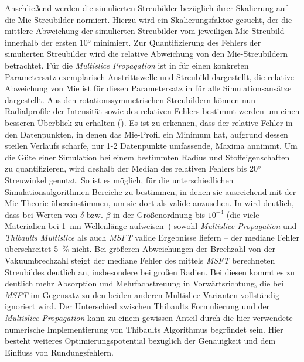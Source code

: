 Anschließend werden die simulierten Streubilder bezüglich ihrer Skalierung auf die Mie-Streubilder normiert. Hierzu wird ein Skalierungsfaktor gesucht, der die mittlere Abweichung der simulierten Streubilder vom jeweiligen Mie-Streubild innerhalb der ersten 10° minimiert. Zur Quantifizierung des Fehlers der simulierten Streubilder wird die relative Abweichung von den Mie-Streubildern betrachtet. Für die \textit{Multislice Propagation} ist in  für einen konkreten Parametersatz exemplarisch Austrittswelle und Streubild dargestellt, die relative Abweichung von Mie ist für diesen Parametersatz in  für alle Simulationsansätze dargestellt. Aus den rotationssymmetrischen Streubildern können nun Radialprofile der Intensität sowie des relativen Fehlers bestimmt werden um einen besseren Überblick zu erhalten (). Es ist zu erkennen, dass der relative Fehler in den Datenpunkten, in denen das Mie-Profil ein Minimum hat, aufgrund dessen steilen Verlaufs scharfe, nur 1-2 Datenpunkte umfassende, Maxima annimmt. Um die Güte einer Simulation bei einem bestimmten Radius und Stoffeigenschaften zu quantifizieren, wird deshalb der Median des relativen Fehlers bis 20° Streuwinkel genutzt. So ist es möglich, für die unterschiedlichen Simulationsalgorithmen Bereiche zu bestimmen, in denen sie ausreichend mit der Mie-Theorie übereinstimmen, um sie dort als valide anzusehen. In  wird deutlich, dass bei Werten von $\delta$ bzw. $\beta$ in der Größenordnung bis $10^{-4}$ (die viele Materialien bei \SI{1}{nm} Wellenlänge aufweisen~\cite{henke}) sowohl \textit{Multislice Propagation} und \textit{Thibaults Multislice} als auch \textit{MSFT} valide Ergebnisse liefern -- der mediane Fehler überschreitet 5~\% nicht. Bei größeren Abweichungen der Brechzahl von der Vakuumbrechzahl steigt der mediane Fehler des mittels \textit{MSFT} berechneten Streubildes deutlich an, insbesondere bei großen Radien. Bei diesen kommt es zu deutlich mehr Absorption und Mehrfachstreuung in Vorwärtsrichtung, die bei \textit{MSFT} im Gegensatz zu den beiden anderen Multislice Varianten vollständig ignoriert wird. Der Unterschied zwischen Thibaults Formulierung und der \textit{Multislice Propagation} kann zu einem gewissen Anteil durch die hier verwendete numerische Implementierung von Thibaults Algorithmus begründet sein. Hier besteht weiteres Optimierungspotential bezüglich der Genauigkeit und dem Einfluss von Rundungsfehlern.

